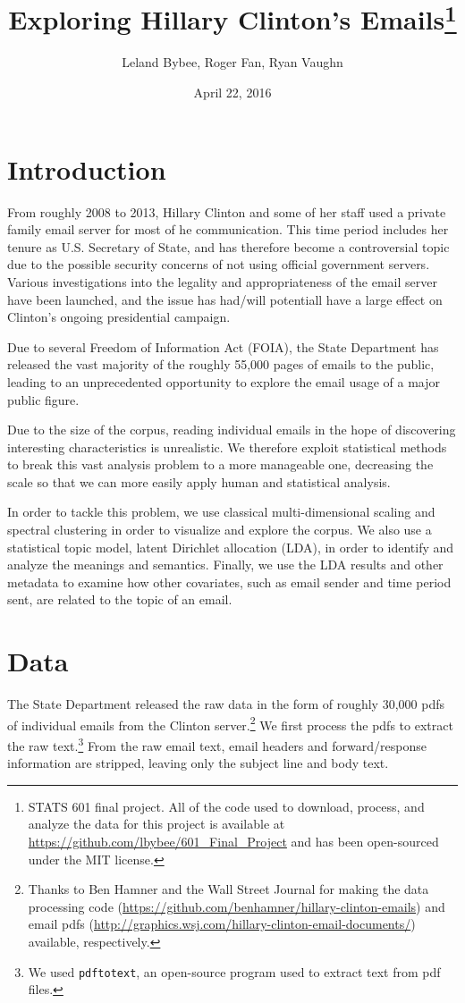 \documentclass[12pt]{article}
\theoremstyle{definition}
\theoremstyle{algodesc}
\begin{document}
\title{Exploring Hillary Clinton's Emails\thanks{STATS 601 final project. All of the code used to download, process, and analyze the data for this project is available at \url{https://github.com/lbybee/601_Final_Project} and has been open-sourced under the MIT license.}}
\author{
    Leland Bybee, Roger Fan, Ryan Vaughn
}
\date{April 22, 2016}

\maketitle


\section{Introduction}
From roughly 2008 to 2013, Hillary Clinton and some of her staff used a private family email server for most of he communication. This time period includes her tenure as U.S. Secretary of State, and has therefore become a controversial topic due to the possible security concerns of not using official government servers. Various investigations into the legality and appropriateness of the email server have been launched, and the issue has had/will potentiall have a large effect on Clinton's ongoing presidential campaign.

Due to several Freedom of Information Act (FOIA), the State Department has released the vast majority of the roughly 55,000 pages of emails to the public, leading to an unprecedented opportunity to explore the email usage of a major public figure.

Due to the size of the corpus, reading individual emails in the hope of discovering interesting characteristics is unrealistic. We therefore exploit statistical methods to break this vast analysis problem to a more manageable one, decreasing the scale so that we can more easily apply human and statistical analysis.

In order to tackle this problem, we use classical multi-dimensional scaling and spectral clustering in order to visualize and explore the corpus. We also use a statistical topic model, latent Dirichlet allocation (LDA), in order to identify and analyze the meanings and semantics. Finally, we use the LDA results and other metadata to examine how other covariates, such as email sender and time period sent, are related to the topic of an email.


\section{Data}
The State Department released the raw data in the form of roughly 30,000 pdfs of individual emails from the Clinton server.\footnote{Thanks to Ben Hamner and the Wall Street Journal for making the data processing code (\url{https://github.com/benhamner/hillary-clinton-emails}) and email pdfs (\url{http://graphics.wsj.com/hillary-clinton-email-documents/}) available, respectively.} We first process the pdfs to extract the raw text.\footnote{We used \texttt{pdftotext}, an open-source program used to extract text from pdf files.} From the raw email text, email headers and forward/response information are stripped, leaving only the subject line and body text.
\end{document}

